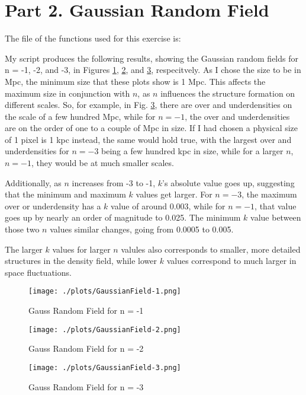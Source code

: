 \section{Part 2. Gaussian Random Field}

The file of the functions used for this exercise is:



My script produces the following results, showing the Gaussian random fields for n = -1, -2, and -3, in Figures \ref{fig:gauss1}, \ref{fig:gauss2}, and \ref{fig:gauss3}, respecitvely.
As I chose the size to be in Mpc, the minimum size that these plots show is 1 Mpc. This affects the
maximum size in conjunction with $n$, as $n$ influences the structure formation on different scales. So, for example,
in Fig. \ref{fig:gauss3}, there are over and underdensities on the scale of a few hundred Mpc, while for
$n = -1$, the over and underdensities are on the order of one to a couple of Mpc in size. If I had chosen a physical size
of 1 pixel is 1 kpc instead, the same would hold true, with the largest over and underdensities for $n = -3$ being a few hundred kpc
in size, while for a larger $n$, $n = -1$, they would be at much smaller scales.

Additionally, as $n$ increases from -3 to -1, $k$'s absolute value goes up, suggesting that the minimum and maximum $k$
values get larger. For $n = -3$, the maximum over or underdensity has a $k$ value of around 0.003, while for $n = -1$, that value
goes up by nearly an order of magnitude to 0.025. The minimum $k$ value between those two $n$ values similar changes, going from 0.0005
to 0.005.

The larger $k$ values for larger $n$ valules also corresponds to smaller, more detailed structures in the density field, while
lower $k$ values correspond to much larger in space fluctuations.


\begin{figure}[h!]
  \centering
  \texttt{[image: ./plots/GaussianField-1.png]}
  \caption{Gauss Random Field for n = -1}
  \label{fig:gauss1}
\end{figure}

\begin{figure}[h!]
  \centering
  \texttt{[image: ./plots/GaussianField-2.png]}
  \caption{Gauss Random Field for n = -2}
  \label{fig:gauss2}
\end{figure}

\begin{figure}[h!]
  \centering
  \texttt{[image: ./plots/GaussianField-3.png]}
  \caption{Gauss Random Field for n = -3}
  \label{fig:gauss3}
\end{figure}

